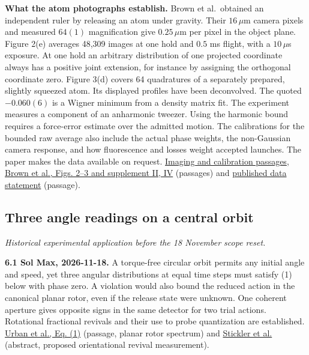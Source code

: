 \documentclass[11pt,a4paper]{article}
\begin{document}
\textbf{What the atom photographs establish.} Brown et al.~obtained an
independent ruler by releasing an atom under gravity. Their \(16\,\mu\)m
camera pixels and measured \(64(1)\) magnification give \(0.25\,\mu\)m
per pixel in the object plane. Figure 2(e) averages 48,309 images at one
hold and \(0.5\) ms flight, with a \(10\,\mu\)s exposure. At one hold an
arbitrary distribution of one projected coordinate always has a positive
joint extension, for instance by assigning the orthogonal coordinate
zero. Figure 3(d) covers 64 quadratures of a separately prepared,
slightly squeezed atom. Its displayed profiles have been deconvolved.
The quoted \(-0.060(6)\) is a Wigner minimum from a density matrix fit.
The experiment measures a component of an anharmonic tweezer. Using the
harmonic bound requires a force-error estimate over the admitted motion.
The calibrations for the bounded raw average also include the actual
phase weights, the non-Gaussian camera response, and how fluorescence
and losses weight accepted launches. The paper makes the data available
on request. \href{../docs/BrownEtAl_AtomTimeOfFlight_2023.md}{Imaging
and calibration passages},
\href{https://arxiv.org/pdf/2203.03053v2}{Brown et al., Figs. 2--3 and
supplement II, IV} (passages) and
\href{https://par.nsf.gov/servlets/purl/10431090\#page=5}{published data
statement} (passage).

\subsection{Three angle readings on a central
orbit}\label{three-angle-readings-on-a-central-orbit}

\emph{Historical experimental application before the 18 November scope
reset.}

\textbf{6.1 Sol Max, 2026-11-18.} A torque-free circular orbit permits
any initial angle and speed, yet three angular distributions at equal
time steps must satisfy (1) below with phase zero. A violation would
also bound the reduced action in the canonical planar rotor, even if the
release state were unknown. One coherent aperture gives opposite signs
in the same detector for two trial actions. Rotational fractional
revivals and their use to probe quantization are established.
\href{https://arxiv.org/pdf/1903.05763\#page=2}{Urban et al., Eq. (1)}
(passage, planar rotor spectrum) and
\href{https://arxiv.org/abs/1803.01778}{Stickler et al.} (abstract,
proposed orientational revival measurement).
\end{document}
